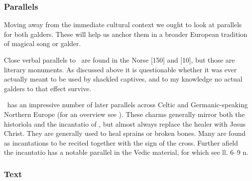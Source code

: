\subsubsection{Parallels}

Moving away from the immediate cultural context we ought to look at parallels for both galders.  These will help us anchor them in a broader European tradition of magical song or galder.

Close verbal parallels to \MerseburgOne\ are found in the Norse [150] and [10], but those are literary monuments.  As discussed above it is questionable whether it was ever actually meant to be used by shackled captives, and to my knowledge no actual galders to that effect survive.

\MerseburgTwo\ has an impressive number of later parallels across Celtic and Germanic-speaking Northern Europe (for an overview see \cite{HopkinsMerseburg}).  These charms generally mirror both the historiola and the incantatio of \MerseburgTwo, but almost always replace the healer with Jesus Christ.  They are generally used to heal sprains or broken bones.  Many are found as incantations to be recited together with the sign of the cross.  Further afield the incantatio has a notable parallel in the Vedic material, for which see ll. 6--9 n.


\sectionline

\subsubsection{Text}

